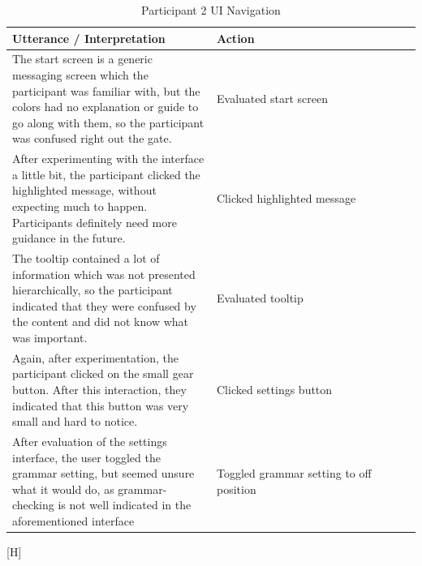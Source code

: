 \documentclass[acmsmall,screen,authorversion,nonacm]{acmart}
\begin{document}
\begin{table}[H]
    \begin{tabular}{|p{0.5 \linewidth}|p{0.5 \linewidth}|}
    \hline
    Utterance / Interpretation                                                                                                                                                                                    & Action                                  \\ \hline
    The start screen is a generic messaging screen which the participant was familiar with, but the colors had no explanation or guide to go along with them, so the participant was confused right out the gate. & Evaluated start screen                  \\ \hline
    After experimenting with the interface a little bit, the participant clicked the highlighted message, without expecting much to happen. Participants definitely need more guidance in the future.             & Clicked highlighted message             \\ \hline
    The tooltip contained a lot of information which was not presented hierarchically, so the participant indicated that they were confused by the content and did not know what was important.                   & Evaluated tooltip                       \\ \hline
    Again, after experimentation, the participant clicked on the small gear button. After this interaction, they indicated that this button was very small and hard to notice.                                    & Clicked settings button                 \\ \hline
    After evaluation of the settings interface, the user toggled the grammar setting, but seemed unsure what it would do, as grammar-checking is not well indicated in the aforementioned interface               & Toggled grammar setting to off position \\ \hline
    \end{tabular}
    \caption{Participant 2 UI Navigation}
    \label{tab:SimpUser2Task1}

\end{table}[H]
\end{document}
